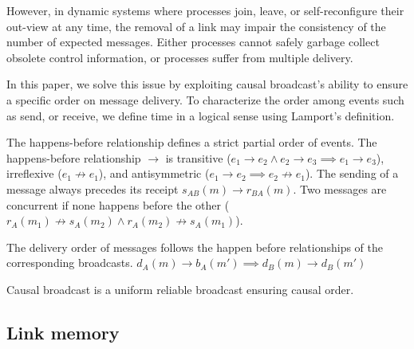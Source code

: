 However, in dynamic systems where processes join, leave, or self-reconfigure
their out-view at any time, the removal of a link may impair the consistency of
the number of expected messages. Either processes cannot safely garbage collect
obsolete control information, or processes suffer from multiple delivery.

In this paper, we solve this issue by exploiting causal broadcast's ability to
ensure a specific order on message delivery. To characterize the order among
events such as send, or receive, we define time in a logical sense using
Lamport’s definition.

\begin{definition}
  The happens-before relationship defines a strict partial order of events. The
  happens-before relationship $\rightarrow$ is transitive
  ($e_1 \rightarrow e_2 \wedge e_2 \rightarrow e_3 \implies e_1 \rightarrow
  e_3$),
  irreflexive ($e_1 \not\rightarrow e_1$), and antisymmetric
  ($e_1 \rightarrow e_2 \implies e_2 \not\rightarrow e_1$).  The sending of a
  message always precedes its receipt $s_{AB}(m) \rightarrow r_{BA}(m)$. Two
  messages are concurrent if none happens before the other
  ($r_A(m_1) \not\rightarrow s_A(m_2) \wedge r_A(m_2) \not\rightarrow s_A(m_1)$).
\end{definition}

\begin{definition}
  The delivery order of messages follows the happen before relationships of the
  corresponding broadcasts.
  $d_A(m) \rightarrow b_A(m') \implies d_B(m) \rightarrow d_B(m')$
\end{definition}

\begin{definition}
  Causal broadcast is a uniform reliable broadcast ensuring causal order.
\end{definition}


\subsection{Link memory}

